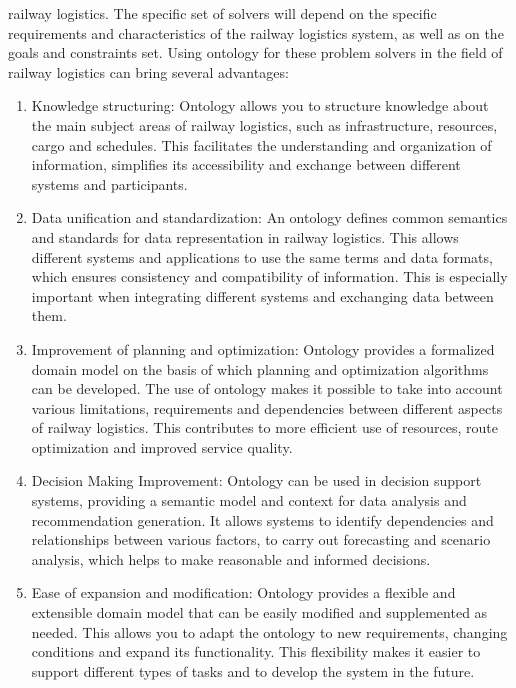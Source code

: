 \documentclass[a4paper]{article}
\begin{document}
\begin{multicols}{2}
railway logistics. The specific set of solvers will depend
on the specific requirements and characteristics of the
railway logistics system, as well as on the goals and
constraints set.
{\hspace{0.2cm}} Using ontology for these problem solvers in the field
of railway logistics can bring several advantages: \par
\renewcommand{\labelenumi}{\theenumi)}
\begin{enumerate} [itemsep=-5pt, labelsep=5pt]
    \item Knowledge structuring: Ontology allows you to
structure knowledge about the main subject areas of railway logistics, such as infrastructure,
resources, cargo and schedules. This facilitates
the understanding and organization of information,
simplifies its accessibility and exchange between
different systems and participants.
    \item Data unification and standardization: An ontology
defines common semantics and standards for data
representation in railway logistics. This allows different systems and applications to use the same
terms and data formats, which ensures consistency
and compatibility of information. This is especially
important when integrating different systems and
exchanging data between them.
    \item Improvement of planning and optimization: Ontology provides a formalized domain model on the basis of which planning and optimization algorithms can be developed. The use of ontology makes it possible to take into account various limitations, requirements and dependencies between different aspects of railway logistics. This contributes to more efficient use of resources, route optimization and improved service quality.
    \item Decision Making Improvement: Ontology can be
used in decision support systems, providing a semantic model and context for data analysis and
recommendation generation. It allows systems to
identify dependencies and relationships between
various factors, to carry out forecasting and scenario analysis, which helps to make reasonable and
informed decisions.
    \item Ease of expansion and modification: Ontology
provides a flexible and extensible domain model
that can be easily modified and supplemented as
needed. This allows you to adapt the ontology to
new requirements, changing conditions and expand
its functionality. This flexibility makes it easier to
support different types of tasks and to develop the
system in the future.
\end{enumerate} 


\end{multicols}
\end{document}
